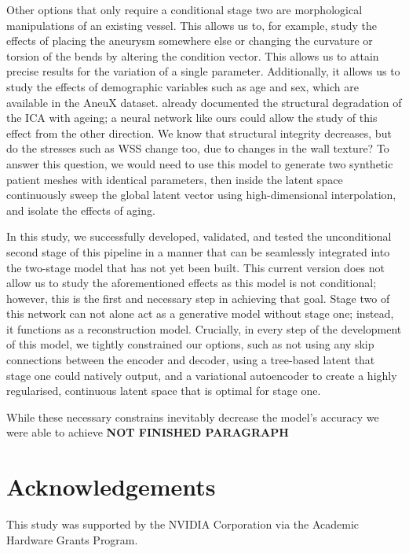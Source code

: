 \documentclass[12pt,a4paper]{article}
\begin{document}
Other options that only require a conditional stage two are morphological manipulations of an existing vessel. This allows us to, for example, study the effects of placing the aneurysm somewhere else or changing the curvature or torsion of the bends by altering the condition vector. This allows us to attain precise results for the variation of a single parameter. Additionally, it allows us to study the effects of demographic variables such as age and sex, which are available in the AneuX dataset. \citet{fonck2009} already documented the structural degradation of the ICA with ageing; a neural network like ours could allow the study of this effect from the other direction. We know that structural integrity decreases, but do the stresses such as WSS change too, due to changes in the wall texture? To answer this question, we would need to use this model to generate two synthetic patient meshes with identical parameters, then inside the latent space continuously sweep the global latent vector using high-dimensional interpolation, and isolate the effects of aging.

In this study, we successfully developed, validated, and tested the unconditional second stage of this pipeline in a manner that can be seamlessly integrated into the two-stage model that has not yet been built. This current version does not allow us to study the aforementioned effects as this model is not conditional; however, this is the first and necessary step in achieving that goal. Stage two of this network can not alone act as a generative model without stage one; instead, it functions as a reconstruction model. Crucially, in every step of the development of this model, we tightly constrained our options, such as not using any skip connections between the encoder and decoder, using a tree-based latent that stage one could natively output, and a variational autoencoder to create a highly regularised, continuous latent space that is optimal for stage one.

While these necessary constrains inevitably decrease the model's accuracy we were able to achieve \textbf{NOT FINISHED PARAGRAPH}

\section*{Acknowledgements}
This study was supported by the NVIDIA Corporation via the Academic Hardware Grants Program.

\printbibliography
\end{document}
